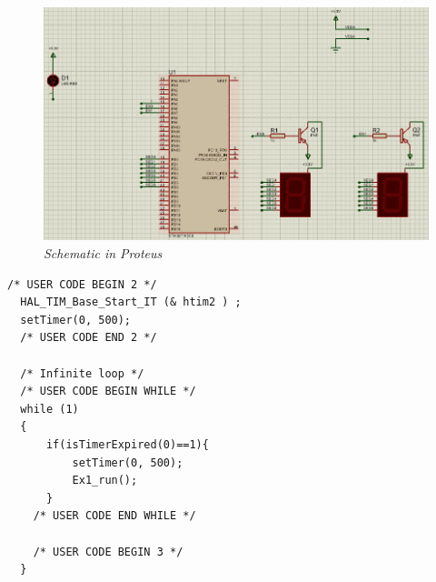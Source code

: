 \begin{figure}[!htp]
    \centering
    \includegraphics[width=5.5in]{source/picture/bai_2/pic1.jpg}
    \caption{\textit{ Schematic in Proteus}}
    \label{bai2_pic1a}
\end{figure}
\begin{lstlisting}[caption=main.c]
/* USER CODE BEGIN 2 */
  HAL_TIM_Base_Start_IT (& htim2 ) ;
  setTimer(0, 500);
  /* USER CODE END 2 */

  /* Infinite loop */
  /* USER CODE BEGIN WHILE */
  while (1)
  {
	  if(isTimerExpired(0)==1){
		  setTimer(0, 500);
		  Ex1_run();
	  }
    /* USER CODE END WHILE */

    /* USER CODE BEGIN 3 */
  }
\end{lstlisting}
